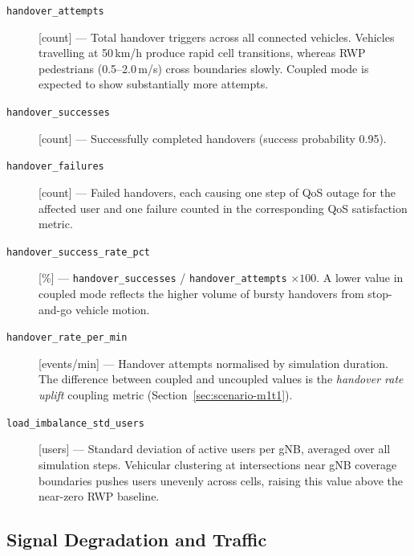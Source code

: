 \begin{description}

\item[\texttt{handover\_attempts}] [count] ---
  Total handover triggers across all connected vehicles.  Vehicles travelling
  at 50\,km/h produce rapid cell transitions, whereas RWP pedestrians
  (0.5--2.0\,m/s) cross boundaries slowly.  Coupled mode is expected to show
  substantially more attempts.

\item[\texttt{handover\_successes}] [count] ---
  Successfully completed handovers (success probability 0.95).

\item[\texttt{handover\_failures}] [count] ---
  Failed handovers, each causing one step of QoS outage for the affected user
  and one failure counted in the corresponding QoS satisfaction metric.

\item[\texttt{handover\_success\_rate\_pct}] [\%] ---
  \texttt{handover\_successes} / \texttt{handover\_attempts} $\times 100$.
  A lower value in coupled mode reflects the higher volume of bursty handovers
  from stop-and-go vehicle motion.

\item[\texttt{handover\_rate\_per\_min}] [events/min] ---
  Handover attempts normalised by simulation duration.  The difference between
  coupled and uncoupled values is the \emph{handover rate uplift} coupling
  metric (Section~\ref{sec:scenario-m1t1}).

\item[\texttt{load\_imbalance\_std\_users}] [users] ---
  Standard deviation of active users per gNB, averaged over all simulation
  steps.  Vehicular clustering at intersections near gNB coverage boundaries
  pushes users unevenly across cells, raising this value above the near-zero
  RWP baseline.

\end{description}

\subsection*{Signal Degradation and Traffic}

